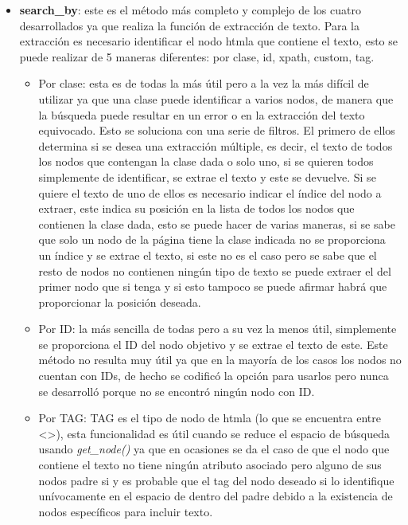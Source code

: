 \begin{itemize}
    \item \textbf{search\_by}: este es el método más completo y complejo de los
    cuatro desarrollados ya que realiza la función de extracción de texto. Para
    la extracción es necesario identificar el nodo \gls{htmla} que contiene el texto,
    esto se puede realizar de 5 maneras diferentes: por clase, id, xpath,
    custom, tag. 
    \begin{itemize}
        \item Por clase: esta es de todas la más útil pero a la vez la más
        difícil de utilizar ya que una clase puede identificar a varios nodos,
        de manera que la búsqueda puede resultar en un error o en la extracción
        del texto equivocado. Esto se soluciona con una serie de filtros. El
        primero de ellos determina si se desea una extracción múltiple, es
        decir, el texto de todos los nodos que contengan la clase dada o solo
        uno, si se quieren todos simplemente de identificar, se extrae el texto
        y este se devuelve. Si se quiere el texto de uno de ellos es necesario
        indicar el índice del nodo a extraer, este indica su posición en la
        lista de todos los nodos que contienen la clase dada, esto se puede
        hacer de varias maneras, si se sabe que solo un nodo de la página tiene
        la clase indicada no se proporciona un índice y se extrae el texto, si
        este no es el caso pero se sabe que el resto de nodos no contienen
        ningún tipo de texto se puede extraer el del primer nodo que si tenga y
        si esto tampoco se puede afirmar habrá que proporcionar la posición
        deseada. 
        
        \item Por ID: la más sencilla de todas pero a su vez la menos útil,
        simplemente se proporciona el ID del nodo objetivo y se extrae el texto
        de este. Este método no resulta muy útil ya que en la mayoría de los
        casos los nodos no cuentan con IDs, de hecho se codificó la opción para
        usarlos pero nunca se desarrolló porque no se encontró ningún nodo con
        ID. 
    
        \item Por TAG: TAG es el tipo de nodo de \gls{htmla} (lo que se encuentra entre
        <>),  esta funcionalidad es útil cuando se reduce el espacio de búsqueda
        usando \textit{get\_node()} ya que en ocasiones se da el caso de que el nodo que
        contiene el texto no tiene ningún atributo asociado pero alguno de sus
        nodos padre si y es probable que el tag del nodo deseado si lo
        identifique unívocamente en el espacio de dentro del padre debido a la
        existencia de nodos específicos para incluir texto. 
    

\end{itemize}
\end{itemize}

